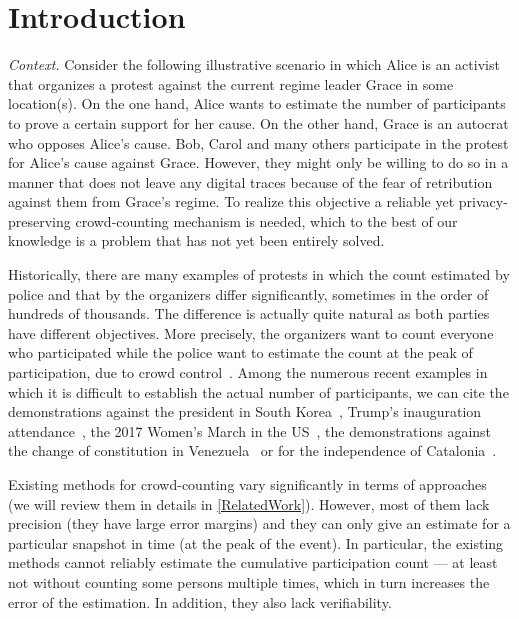 \section{Introduction}%
\label{Introduction}

\emph{Context.} Consider the following illustrative scenario in which Alice is an activist that organizes a protest against the current regime leader Grace in some location(s).
On the one hand, Alice wants to estimate the number of participants to prove a certain support for her cause.
On the other hand, Grace is an autocrat who opposes Alice's cause.
Bob, Carol and many others participate in the protest for Alice's cause against Grace.
However, they might only be willing to do so in a manner that does not leave any digital traces because of the fear of retribution against them from Grace's regime. 
To realize this objective a reliable yet privacy-preserving crowd-counting mechanism is needed, which to the best of our knowledge is a problem that has not yet been entirely solved.

Historically, there are many examples of protests in which the count estimated by police and that by the organizers 
differ significantly, sometimes in the order of hundreds of thousands.
The difference is actually quite natural as both parties have different objectives.
More precisely, the organizers want to count everyone who participated while the police want to estimate the count at the peak of participation, due to crowd control~\cite{2016DemonstrationsInSeoul}.
Among the numerous recent examples in which it is difficult to establish the actual number of participants, we can cite the demonstrations against the president in South Korea~\cite{2016DemonstrationsInSeoul}, Trump's inauguration attendance~\cite{HowWillWeKnowTrumpInauguralCrowdSize}, the 2017 Women's March in the US~\cite{2017WomensMarchesInUS}, the demonstrations against the change of constitution in Venezuela~\cite{AlJazeeraOnVenezuela2017} or for the independence of Catalonia~\cite{CataloniaDemonstrations}.

Existing methods for crowd-counting vary significantly in terms of approaches (we will review them in details in \cref{RelatedWork}).
However, most of them lack precision (\ie they have large error margins) and they can only give an estimate for a particular snapshot in time (\eg at the peak of the event). 
In particular, the existing methods cannot reliably estimate the cumulative participation count --- at least not without counting some persons multiple times, which in turn increases the error of the estimation.
In addition, they also lack verifiability. 

